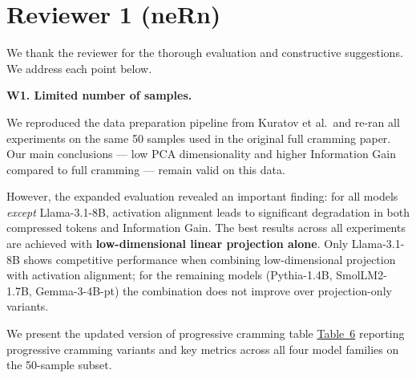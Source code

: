 
\section{Reviewer 1 (neRn)}

We thank the reviewer for the thorough evaluation and constructive suggestions.
We address each point below.

\textbf{W1. Limited number of samples.}

We reproduced the data preparation pipeline from Kuratov et al.\ and re-ran all experiments on the same 50 samples used in the original full cramming paper. Our main conclusions --- low PCA dimensionality and higher Information Gain compared to full cramming --- remain valid on this data.

However, the expanded evaluation revealed an important finding: for all models
\emph{except} Llama-3.1-8B, activation alignment leads to significant degradation in
both compressed tokens and Information Gain. The best results across all experiments
are achieved with \textbf{low-dimensional linear projection alone}. Only Llama-3.1-8B
shows competitive performance when combining low-dimensional projection with activation
alignment; for the remaining models (Pythia-1.4B, SmolLM2-1.7B, Gemma-3-4B-pt) the
combination does not improve over projection-only variants.

We present the updated version of progressive cramming table \href{https://drive.google.com/file/d/148Cxg2jOx_-MIH5XC0I-oPbwVLG0Ktiz/view?usp=sharing}{Table~6}
reporting progressive cramming variants and key metrics across all four model families
on the 50-sample subset.

